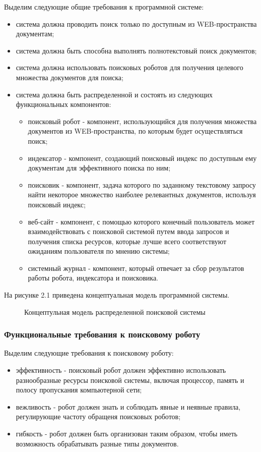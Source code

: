 Выделим следующие общие требования к программной системе:
\begin{itemize}
\item система должна проводить поиск только по доступным из WEB-пространства документам;
\item система должна быть способна выполнять полнотекстовый поиск документов;
\item система должна использовать поисковых роботов для получения целевого множества документов для поиска;
\item система должна быть распределенной и состоять из следующих функциональных компонентов:
\begin{itemize}
\item поисковый робот - компонент, использующийся для получения множества документов из WEB-пространства, по которым будет осуществляться поиск;
\item индексатор - компонент, создающий поисковый индекс по доступным ему документам для эффективного поиска по ним;
\item поисковик - компонент, задача которого по заданному текстовому запросу найти некоторое множество наиболее релевантных документов, используя поисковый индекс;
\item веб-сайт - компонент, с помощью которого конечный пользователь может взаимодействовать с поисковой системой путем ввода запросов и получения списка ресурсов, которые лучше всего соответствуют ожиданиям пользователя по мнению системы;
\item системный журнал - компонент, который отвечает за сбор результатов работы робота, индексатора и поисковика.
\end{itemize}
\end{itemize}

На рисунке 2.1 приведена концептуальная модель программной системы.

\begin{figure}[H]
\caption{Концептульная модель распределенной поисковой системы}
\label{concept_system_model:image}
\end{figure}

\subsubsection{Функциональные требования к поисковому роботу}
Выделим следующие требования к поисковому роботу:
\begin{itemize}
\item эффективность - поисковый робот должен эффективно использовать разнообразные ресурсы поисковой системы, включая процессор, память и полосу пропускания компьютерной сети;
\item вежливость - робот должен знать и соблюдать явные и неявные правила, регулирующие частоту обращеня поисковых роботов;
\item гибкость - робот должен быть организован таким образом, чтобы иметь возможность обрабатывать разные типы документов.
\end{itemize}

